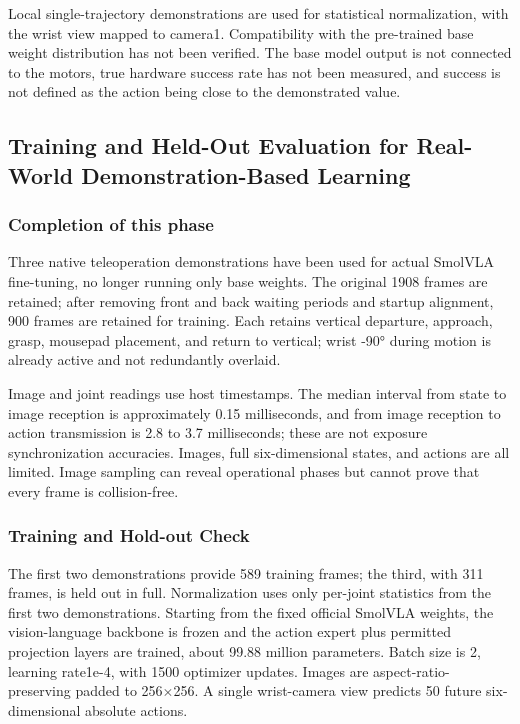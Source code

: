 Local single-trajectory demonstrations are used for statistical normalization, with the wrist view mapped to camera1. Compatibility with the pre-trained base weight distribution has not been verified. The base model output is not connected to the motors, true hardware success rate has not been measured, and success is not defined as the action being close to the demonstrated value.


\subsection{Training and Held-Out Evaluation for Real-World Demonstration-Based Learning}\label{s07-detail-5}

\subsubsection{Completion of this phase}\label{s07-detail-6}

Three native teleoperation demonstrations have been used for actual SmolVLA fine-tuning, no longer running only base weights. The original 1908 frames are retained; after removing front and back waiting periods and startup alignment, 900 frames are retained for training. Each retains vertical departure, approach, grasp, mousepad placement, and return to vertical; wrist -90° during motion is already active and not redundantly overlaid.

Image and joint readings use host timestamps. The median interval from state to image reception is approximately 0.15 milliseconds, and from image reception to action transmission is 2.8 to 3.7 milliseconds; these are not exposure synchronization accuracies. Images, full six-dimensional states, and actions are all limited. Image sampling can reveal operational phases but cannot prove that every frame is collision-free.

\subsubsection{Training and Hold-out Check}\label{s07-detail-7}

The first two demonstrations provide 589 training frames; the third, with 311 frames, is held out in full. Normalization uses only per-joint statistics from the first two demonstrations. Starting from the fixed official SmolVLA weights, the vision-language backbone is frozen and the action expert plus permitted projection layers are trained, about 99.88 million parameters. Batch size is 2, learning rate1e-4, with 1500 optimizer updates. Images are aspect-ratio-preserving padded to 256\(\times\)256. A single wrist-camera view predicts 50 future six-dimensional absolute actions.


